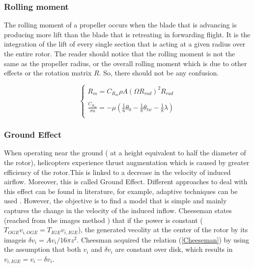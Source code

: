 \documentclass{thesisreport}
\begin{document}
\newpage

\subsubsection{Rolling moment}


The rolling moment of a propeller occurs when the blade that is advancing is producing more lift than the blade that is retreating in forwarding flight. It is the integration of the lift of every single section that is acting at a given radius over the entire rotor.
The reader should notice that the rolling moment is not the same as the propeller radius, or the overall rolling moment which is due to other effects or the rotation matrix $R$. So, there should not be any confusion.

\begin{equation}
\begin{cases}
R_m = C_{R_m}\rho A (\Omega R_{rad})^2 R_{rad} \\
\\
\frac{C_{R_m}}{\sigma a} = -\mu (\frac{1}{6} \theta_0 - \frac{1}{8} \theta_{tw} - \frac{1}{8} \lambda)\\
\end{cases}
\end{equation}

\subsubsection{Ground Effect}


When operating near the ground ( at a height equivalent to half the diameter of the rotor), helicopters experience thrust augmentation which is caused by greater efficiency of the rotor.This is linked to a decrease in the velocity of induced airflow. Moreover, this is called Ground Effect. Different approaches to deal with this effect can be found in literature, for example, adaptive techniques can  be used \cite{Guenard2006}.
However, the objective is to find a model that is simple and mainly captures the change in the velocity of the induced inflow.
Cheeseman \cite{Cheeseman1957} states (reached from the images method \cite{Griffiths2002}) that if the power is constant ($T_{OGE}v_{i,OGE} = T_{IGE}v_{i,IGE}$), the generated vecolity at the center of the rotor by its imageis $\delta v_i = Av_i/16 \pi z^2$.
Cheesman acquired the relation (\ref{Cheeseman}) by using the assumption that both $v_i$ and $\delta v_i$ are constant over disk, which results in $v_{i,IGE}=v_i-\delta v_i$.
\end{document}
